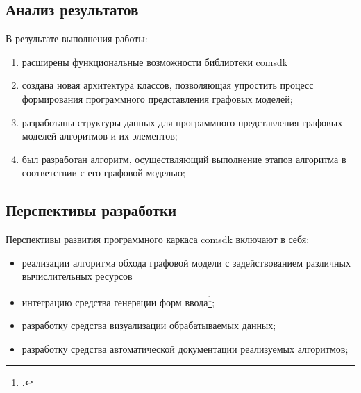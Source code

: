﻿%
\subsection*{Анализ результатов}
\begin{frame}%

	В результате выполнения работы:
	\begin{enumerate}[1)]
		\item расширены функциональные возможности библиотеки comsdk
		\item создана новая архитектура классов, позволяющая упростить процесс формирования программного представления графовых моделей;
		\item разработаны структуры данных для программного представления графовых моделей алгоритмов и их элементов;
		\item был разработан алгоритм, осуществляющий выполнение этапов алгоритма в соответствии с его графовой моделью;
	\end{enumerate}

\end{frame}
\subsection*{Перспективы разработки}
\begin{frame}
	Перспективы развития программного каркаса comsdk включают в себя:
	\begin{itemize}
		\item реализации алгоритма обхода графовой модели с задействованием различных вычислительных ресурсов
		\item интеграцию средства генерации форм ввода\footcite{SokolovPershin2017};
		\item разработку средства визуализации обрабатываемых данных;
		\item разработку средства автоматической документации реализуемых алгоритмов;
	\end{itemize}

\end{frame}

